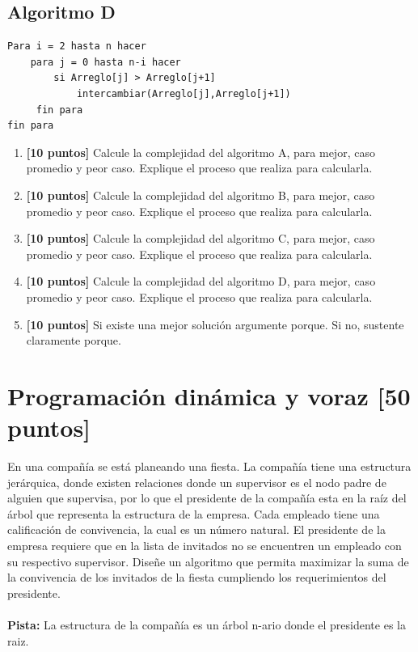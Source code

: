 \documentclass[9pt,twocolumn]{article}
\begin{document}
\subsection*{Algoritmo D}

\begin{lstlisting}
Para i = 2 hasta n hacer
	para j = 0 hasta n-i hacer
		si Arreglo[j] > Arreglo[j+1]
			intercambiar(Arreglo[j],Arreglo[j+1])
	 fin para
fin para
\end{lstlisting}


\begin{enumerate}
	\item \textbf{[10 puntos]} Calcule la complejidad del algoritmo A, para mejor, caso promedio y peor caso. Explique el proceso que realiza para calcularla.
	\item \textbf{[10 puntos]} Calcule la complejidad del algoritmo B, para mejor, caso promedio y peor caso. Explique el proceso que realiza para calcularla.
	\item \textbf{[10 puntos]} Calcule la complejidad del algoritmo C, para mejor, caso promedio y peor caso. Explique el proceso que realiza para calcularla.
	\item \textbf{[10 puntos]} Calcule la complejidad del algoritmo D, para mejor, caso promedio y peor caso. Explique el proceso que realiza para calcularla.
	\item \textbf{[10 puntos]} Si existe una mejor solución argumente porque. Si no, sustente claramente porque.
\end{enumerate}

\section{Programación dinámica y voraz \small{[50 puntos]}} 

En una compañía se está planeando una fiesta. La compañía tiene una estructura jerárquica, donde existen relaciones donde un supervisor es el nodo padre de alguien que supervisa, por lo que el presidente de la compañía esta en la raíz del árbol que representa la estructura de la empresa. Cada empleado tiene una calificación de convivencia, la cual es un número natural. El presidente de la empresa requiere que en la lista de invitados no se encuentren un empleado con su respectivo supervisor. Diseñe un algoritmo que permita maximizar la suma de la convivencia de los invitados de la fiesta cumpliendo los requerimientos del presidente.
\\\\
\textbf{Pista:} La estructura de la compañía es un árbol n-ario donde el presidente es la raiz.
\end{document}
